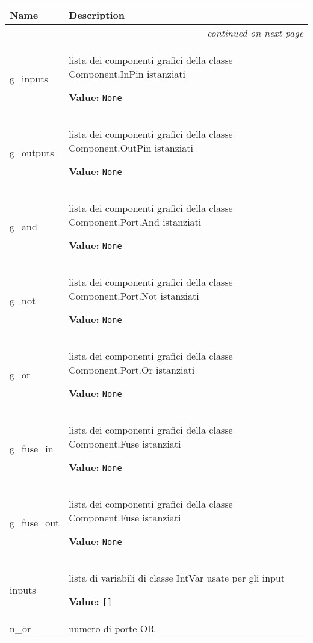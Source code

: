     \vspace{-1cm}
\hspace{\varindent}\begin{longtable}{|p{\varnamewidth}|p{\vardescrwidth}|l}
\cline{1-2}
\cline{1-2} \centering \textbf{Name} & \centering \textbf{Description}& \\
\cline{1-2}
\endhead\cline{1-2}\multicolumn{3}{r}{\small\textit{continued on next page}}\\\endfoot\cline{1-2}
\endlastfoot\raggedright g\-\_\-i\-n\-p\-u\-t\-s\- & \raggedright lista dei componenti grafici della classe Component.InPin 
          istanziati

\textbf{Value:} 
{\tt None}&\\
\cline{1-2}
\raggedright g\-\_\-o\-u\-t\-p\-u\-t\-s\- & \raggedright lista dei componenti grafici della classe Component.OutPin 
          istanziati

\textbf{Value:} 
{\tt None}&\\
\cline{1-2}
\raggedright g\-\_\-a\-n\-d\- & \raggedright lista dei componenti grafici della classe Component.Port.And 
          istanziati

\textbf{Value:} 
{\tt None}&\\
\cline{1-2}
\raggedright g\-\_\-n\-o\-t\- & \raggedright lista dei componenti grafici della classe Component.Port.Not 
          istanziati

\textbf{Value:} 
{\tt None}&\\
\cline{1-2}
\raggedright g\-\_\-o\-r\- & \raggedright lista dei componenti grafici della classe Component.Port.Or 
          istanziati

\textbf{Value:} 
{\tt None}&\\
\cline{1-2}
\raggedright g\-\_\-f\-u\-s\-e\-\_\-i\-n\- & \raggedright lista dei componenti grafici della classe Component.Fuse 
          istanziati

\textbf{Value:} 
{\tt None}&\\
\cline{1-2}
\raggedright g\-\_\-f\-u\-s\-e\-\_\-o\-u\-t\- & \raggedright lista dei componenti grafici della classe Component.Fuse 
          istanziati

\textbf{Value:} 
{\tt None}&\\
\cline{1-2}
\raggedright i\-n\-p\-u\-t\-s\- & \raggedright lista di variabili di classe IntVar usate per gli input

\textbf{Value:} 
{\tt []}&\\
\cline{1-2}
\raggedright n\-\_\-o\-r\- & \raggedright numero di porte OR


\end{longtable}
